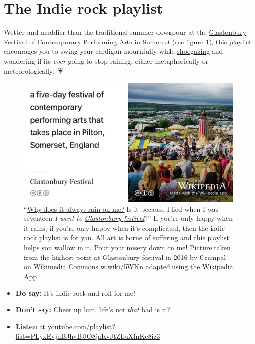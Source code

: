 \documentclass[
]{book}
\providecommand{\tightlist}{%
  \setlength{\itemsep}{0pt}\setlength{\parskip}{0pt}}
\begin{document}
\hypertarget{indie}{%
\section{The Indie rock playlist}\label{indie}}

Wetter and muddier than the traditional summer downpour at the \href{https://en.wikipedia.org/wiki/Glastonbury_Festival}{Glastonbury Festival of Contemporary Performing Arts} in Somerset (see figure \ref{fig:glastonbury-fig}), this playlist encourages you to swing your cardigan mournfully while \href{https://en.wikipedia.org/wiki/Shoegaze}{shoegazing} and wondering if its \emph{ever} going to stop raining, either metaphorically or meteorologically: ☔️

\begin{figure}
\includegraphics[width=0.99\linewidth]{images/glastonbury-festival} \caption{``\href{https://en.wikipedia.org/wiki/Why_Does_It_Always_Rain_on_Me\%3F}{Why does it always rain on me?} Is it because \sout{I lied when I was seventeen} \emph{I went to \href{https://en.wikipedia.org/wiki/Glastonbury_Festival}{Glastonbury festival}}?'' \citep{whydoesitalwaysrainonme} If you're only happy when it rains, if you're only happy when it's complicated, then the indie rock playlist is for you. \citep{onlyhappy} All art is borne of suffering and this playlist helps you wallow in it. Pour your misery down on me! Picture taken from the highest point at Glastonbury festival in 2016 by Czampal on Wikimedia Commons \href{https://w.wiki/5WKn}{w.wiki/5WKn} adapted using the \href{https://apps.apple.com/gb/app/wikipedia/id324715238}{Wikipedia App}}\label{fig:glastonbury-fig}
\end{figure}



\begin{itemize}
\tightlist
\item
  \textbf{Do say:} It's indie rock and roll for me! \citep{indierocknroll}
\item
  \textbf{Don't say:} Cheer up hun, life's not \emph{that} bad is it? \citep{depressingindie}
\item
  \textbf{Listen} at \href{https://youtube.com/playlist?list=PLyxEvjuBJhvBUO8jaKvJtZLuXfnKc8iz3}{youtube.com/playlist?list=PLyxEvjuBJhvBUO8jaKvJtZLuXfnKc8iz3}
\end{itemize}
\end{document}
